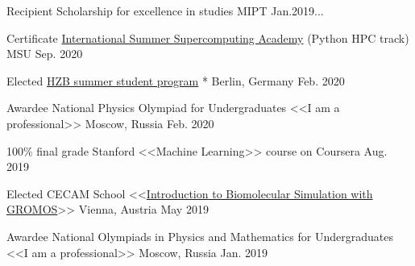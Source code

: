 
\begin{cvhonors}

  \cvhonor
    {Recipient} %
    {Scholarship for excellence in studies} %
    {MIPT} %
    {Jan.2019...} %

  \cvhonor
    {Certificate} %
    {\href{http://academy.hpc-russia.ru/en/organizers}{International Summer Supercomputing Academy} (Python HPC track)} %
    {MSU} %
    {Sep. 2020} %
        
  \cvhonor
    {Elected} %
    {\href{https://www.helmholtz-berlin.de/jobskarriere/sommerstudenten/index_en.html}{HZB summer student program}} %
    {* Berlin, Germany} %
    {Feb. 2020} %
    
  \cvhonor
    {Awardee} %
    {National Physics Olympiad for Undergraduates <<I am a professional>>} %
    {Moscow, Russia} %
    {Feb. 2020} %
        
  \cvhonor
    {100\% final grade} %
    {Stanford <<Machine Learning>> course on Coursera} %
    {} %
    {Aug. 2019} %
    
  \cvhonor
    {Elected} %
    {CECAM School <<\href{https://www.cecam.org/workshop-details/129}{Introduction to Biomolecular Simulation with GROMOS}>>} %
    {Vienna, Austria} %
    {May 2019} %
        
    
  \cvhonor
    {Awardee} %
    {National Olympiads in Physics and Mathematics for Undergraduates <<I am a professional>>} %
    {Moscow, Russia} %
    {Jan. 2019} %
    

\end{cvhonors}
